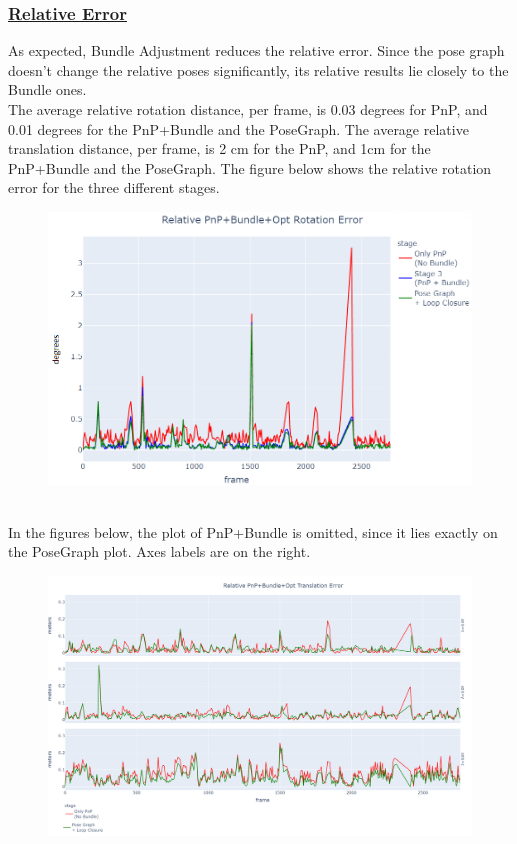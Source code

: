 \documentclass[12pt]{article}
\begin{document}
\subsubsection*{\underline{Relative Error}}
As expected, Bundle Adjustment reduces the relative error. Since the pose graph doesn't change the relative poses significantly, its relative results lie closely to the Bundle ones.\\
The average relative rotation distance, per frame, is 0.03 degrees for PnP, and 0.01 degrees for the PnP+Bundle and the PoseGraph. The average relative translation distance, per frame, is 2 cm for the PnP, and 1cm for the PnP+Bundle and the PoseGraph. The figure below shows the relative rotation error for the three different stages.
\begin{figure}[h]
\centering \includegraphics[width=\textwidth]{Relative PnP+Bundle+Opt Rotation Error}
\end{figure} \\
In the figures below, the plot of PnP+Bundle is omitted, since it lies exactly on the PoseGraph plot. Axes labels are on the right. 
\begin{figure}[H]
\centering \includegraphics[width=\textwidth]{Relative PnP+Opt Translation Error}
\end{figure} 
\end{document}
